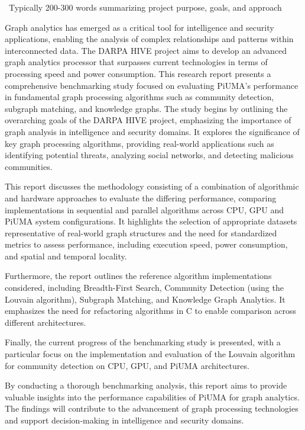 \documentclass[letterpaper, 10pt]{article}
\begin{document}
\abstractname{~Typically 200-300 words summarizing project purpose, goals, and approach~}
\newline\par
\setlength{\parindent}{20pt}
Graph analytics has emerged as a critical tool for intelligence and security applications, enabling the analysis of complex relationships and patterns within interconnected data. The DARPA HIVE project aims to develop an advanced graph analytics processor that surpasses current technologies in terms of processing speed and power consumption. This research report presents a comprehensive benchmarking study focused on evaluating PiUMA's performance in fundamental graph processing algorithms such as community detection, subgraph matching, and knowledge graphs.
The study begins by outlining the overarching goals of the DARPA HIVE project, emphasizing the importance of graph analysis in intelligence and security domains. It explores the significance of key graph processing algorithms, providing real-world applications such as identifying potential threats, analyzing social networks, and detecting malicious communities. 

 This report discusses the methodology consisting of a combination of algorithmic and hardware approaches to evaluate the differing performance, comparing implementations in sequential and parallel algorithms across CPU, GPU and PiUMA system configurations. It highlights the selection of appropriate datasets representative of real-world graph structures and the need for standardized metrics to assess performance, including execution speed, power consumption, and spatial and temporal locality.

Furthermore, the report outlines the reference algorithm implementations considered, including Breadth-First Search, Community Detection (using the Louvain algorithm), Subgraph Matching, and Knowledge Graph Analytics. It emphasizes the need for refactoring algorithms in C to enable comparison across different architectures.

Finally, the current progress of the benchmarking study is presented, with a particular focus on the implementation and evaluation of the Louvain algorithm for community detection on CPU, GPU, and PiUMA architectures.

By conducting a thorough benchmarking analysis, this report aims to provide valuable insights into the performance capabilities of PiUMA for graph analytics. The findings will contribute to the advancement of graph processing technologies and support decision-making in intelligence and security domains.
\end{document}
